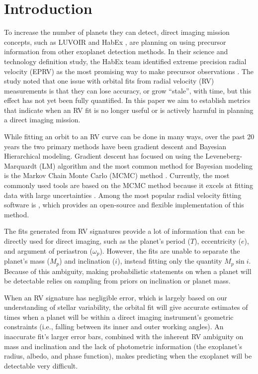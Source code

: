 \section{Introduction}%
To increase the number of planets they can detect, direct imaging mission concepts, such as LUVOIR
\citep{TheLUVOIRTeam2019} and HabEx \citep{gaudiHabitableExoplanetObservatory2020}, are planning on using precursor information
from other exoplanet detection methods.  In their science and technology definition study, the HabEx
team identified extreme precision radial velocity (EPRV) as the most promising way to make precursor
observations  \citep{gaudiHabitableExoplanetObservatory2020}.  The study noted that one issue with orbital fits from radial velocity
(RV) measurements is that they can lose accuracy, or grow ``stale'', with time, but this effect has
not yet been fully quantified.  In this paper we aim to establish metrics that indicate when an RV
fit is no longer useful or is actively harmful in planning a direct imaging mission.

While fitting an orbit to an RV curve can be done in many ways, over the past 20 years the two
primary methods have been gradient descent and Bayesian Hierarchical modeling.  Gradient descent has
focused on using the Leveneberg-Marquardt (LM) algorithm \citep{Levenberg1943b, Marquardt1963b} and
the most common method for Bayesian modeling is the Markov Chain Monte Carlo (MCMC) method
\citep{Metropolis1953, Hastings1970}.  Currently, the most commonly used tools are based on
the MCMC method because it excels at fitting data with large uncertainties \citep{Wright2009b}.
Among the most popular radial velocity fitting software is  \citep{fultonRadvelRadialVelocity2018}, which provides an
open-source and flexible implementation of this method.

The fits generated from RV signatures provide a lot of information that can be directly used for direct
imaging, such as the planet's period ($T$), eccentricity ($e$), and argument of
periastron ($\omega_p$).  However, the fits are unable to separate the planet's mass ($M_p$) and
inclination ($i$), instead fitting only the quantity $M_{p}\sin{i}$.  Because of this ambiguity,
making probabilistic statements on when a planet will be detectable relies on sampling from priors
on inclination or planet mass.

When an RV signature has negligible error, which is largely based on our understanding of stellar
variability, the orbital fit will give accurate estimates of times when a planet will be within a
direct imaging instrument's geometric constraints (i.e., falling between its inner and outer working
angles). An inaccurate fit's larger error bars, combined with the inherent RV ambiguity on mass and
inclination and the lack of photometric information (the exoplanet's radius, albedo, and phase
function), makes predicting when the exoplanet will be detectable very difficult.

